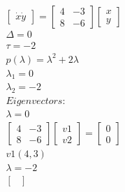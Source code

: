 \documentclass[a4paper,10pt]{article}
\begin{document}
\begin{enumerate}
\begin{enumerate}
\begin{equation}
                    \begin{bmatrix}
                        \dot{x}
                        \dot{y}
                    \end{bmatrix}
                    =
                    \begin{bmatrix}
                        4 & -3\\
                        8 & -6
                    \end{bmatrix}
                    \begin{bmatrix}
                        x\\
                        y
                    \end{bmatrix}
                \end{equation}
                \begin{equation}
                    \begin{aligned}
                        \Delta=0\\
                        \tau=-2\\
                        p(\lambda)= \lambda^{2}+2\lambda\\
                        \lambda_{1}= 0\\
                        \lambda_{2}= -2\\
                        Eigenvectors:\\
                        \lambda= 0\\
                        \begin{bmatrix}
                            4 & -3\\
                            8 & -6
                        \end{bmatrix}
                        \begin{bmatrix}
                            v1\\
                            v2
                        \end{bmatrix}
                        =
                        \begin{bmatrix}
                            0\\
                            0
                        \end{bmatrix}\\
                        v1(4,3)\\
                        \lambda= -2\\
                        \begin{bmatrix}

\end{bmatrix}
\end{aligned}
\end{equation}
\end{enumerate}
\end{enumerate}
\end{document}
